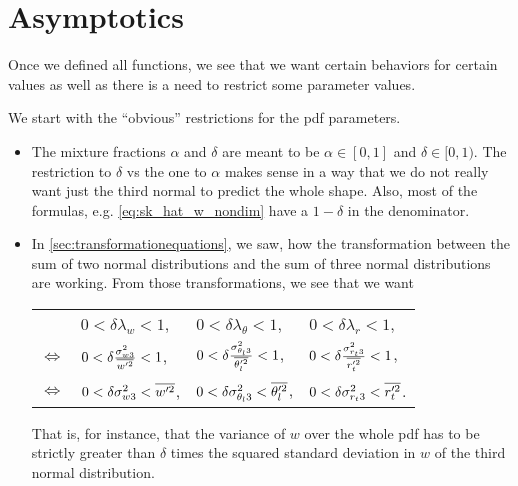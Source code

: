 \chapter{Asymptotics}\label{ch:asymptotics}

Once we defined all functions,
we see that we want certain behaviors for certain values as well as
there is a need to restrict some parameter values.

We start with the \enquote{obvious} restrictions for the \gls{pdf} parameters.
\begin{itemize}
    \item The mixture fractions $\alpha$ and $\delta$ are meant to be $\alpha \in [0,1]$ and $\delta \in [0,1)$.
    The restriction to $\delta$ vs the one to $\alpha$ makes sense in a way
    that we do not really want just the third normal to predict the whole shape.
    Also, most of the formulas, e.g. \cref{eq:sk_hat_w_nondim} have a $1-\delta$ in the denominator.

    \item In \cref{sec:transformationequations}, we saw,
    how the transformation between the sum of two normal distributions
    and the sum of three normal distributions are working.
    From those transformations, we see that we want
    \begin{table}[!htb]
        \centering
        \begin{tabular}{llll}
            &
            $0 < \delta\lambda_w < 1$, &
            $0 < \delta\lambda_\theta < 1$, &
            $0 < \delta\lambda_r < 1$, \\
            $\iff$ &
            $0 < \delta\frac{\sigma_{w3}^2}{\overline{w'^2}} < 1$, &
            $0 < \delta\frac{\sigma_{\theta_l 3}^2}{\overline{\theta_l'^2}} < 1$, &
            $0 < \delta\frac{\sigma_{r_t 3}^2}{\overline{r_t'^2}} < 1$, \\
            $\iff$ &
            $0 < \delta\sigma_{w3}^2 < \overline{w'^2}$, &
            $0 < \delta\sigma_{\theta_l 3}^2 < \overline{\theta_l'^2}$, &
            $0 < \delta\sigma_{r_t 3}^2 < \overline{r_t'^2}$.
        \end{tabular}
        \label{tab:table_asymp_2}
    \end{table}

    That is, for instance,
    that the variance of $w$ over the whole \gls{pdf} has to be strictly greater than $\delta$ times
    the squared standard deviation in $w$ of the third normal distribution.
\end{itemize}

